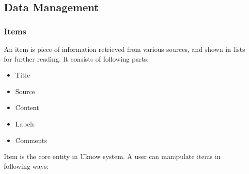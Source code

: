 
\subsection{Data Management}

\subsubsection{Items}

An item is piece of information retrieved from various sources, and
shown in lists for further reading. It consists of following parts:

\begin{itemize}
\itemsep1pt\parskip0pt
\item
  Title
\item
  Source
\item
  Content
\item
  Labels
\item
  Comments
\end{itemize}

Item is the core entity in Uknow system. A user can manipulate items in
following ways:

